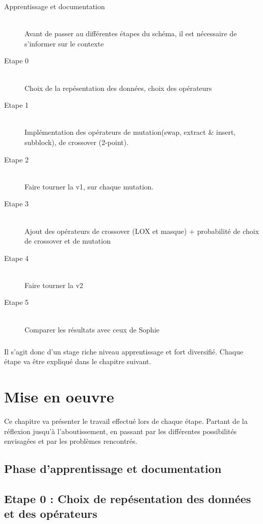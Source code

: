\documentclass[a4paper,10pt]{report}
\begin{document}
	\begin{description}
	  \item [Apprentissage et documentation] {~~\\Avant de passer au différentes étapes du schéma, il est nécessaire de s'informer sur le contexte}
	  \item [Etape 0] {~~\\Choix de la repésentation des données, choix des opérateurs}
	  \item [Etape 1] {~~\\Implémentation des opérateurs de mutation(swap, extract & insert, subblock), de crossover (2-point).}
	  \item [Etape 2] {~~\\Faire tourner la v1, sur chaque mutation.}
	  \item [Etape 3] {~~\\Ajout des opérateurs de crossover (LOX et masque) + probabilité de choix de crossover et de mutation }
	  \item [Etape 4] {~~\\Faire tourner la v2}
	  \item [Etape 5] {~~\\Comparer les résultats avec ceux de Sophie}
	\end{description}
	     

	\paragraph{}
	  Il s'agit donc d'un stage riche niveau apprentissage et fort diversifié. Chaque étape va être expliqué dans le chapitre suivant.

       
  \chapter{Mise en oeuvre}

  Ce chapitre va présenter le travail effectué lors de chaque étape. Partant de la réflexion jusqu'à l'aboutissement, en passant par les différentes possibilités envisagées et par les problèmes rencontrés.
	
	
    \section{Phase d'apprentissage et documentation}
    
    
    
    \section{Etape 0 : Choix de repésentation des données et des opérateurs}
    
\end{document}
